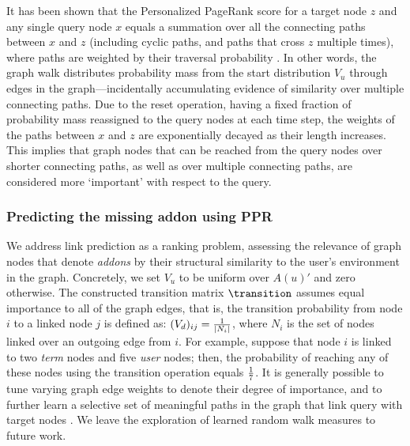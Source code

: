 \documentclass[ijoc,nonblindrev]{informs3} %
\numberwithin{equation}{subsection}
\begin{document}
It has been shown that the Personalized PageRank score for a target node $z$ and any single query node $x$ equals a summation over all the connecting paths between $x$ and $z$ (including cyclic paths, and paths that cross $z$ multiple times), where paths are weighted by their traversal probability \citep{jeh2003scaling,fogaras2004towards}. In other words, the graph walk distributes probability mass from the start distribution $V_u$ through edges in the graph---incidentally accumulating evidence of similarity over multiple connecting paths. Due to the reset operation, having a fixed fraction of probability mass reassigned to the query nodes at each time step, the weights of the paths between $x$ and $z$ are exponentially decayed as their length increases. This implies that graph nodes that can be reached from the query nodes over shorter connecting paths, as well as over multiple connecting paths, are considered more `important' with respect to the query. 

\subsubsection{Predicting the missing addon using PPR}

We address link prediction as a ranking problem, assessing the relevance of graph nodes that denote {\it addons} by their structural
similarity to the user's environment in the graph. Concretely, we set $V_u$ to be uniform over $A(u)'$ and zero otherwise. The constructed transition matrix $\transition$ assumes equal importance to all of
the graph edges, that is, the transition probability from node $i$ to
a linked node $j$ is defined as: $(V_d)_{ij}={1 \over \mid N_i \mid}$,
where $N_i$ is the set of nodes linked over an outgoing edge from $i$. For example, suppose that node $i$ is linked to two {\it term} nodes and five {\it user} nodes; then, the probability of reaching any of these nodes using the transition operation equals ${1\over 7}$. It is generally possible to tune varying graph edge weights to denote their degree of importance, and to further learn a selective set of meaningful paths in the graph that link query with target nodes \citep{minkov2010improving,lao2010relational}. We leave the exploration of learned random walk measures to future work. 
\end{document}
